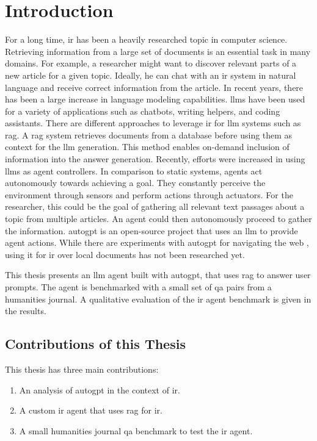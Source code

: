 \documentclass[../main.tex]{subfiles}
\begin{document}
\chapter{Introduction}
\label{ch:introduction}

For a long time, \gls{ir} has been a heavily researched topic in computer science.
Retrieving information from a large set of documents is an essential task in many domains.
For example,
a researcher might want to discover relevant parts of a new article for a given topic.
Ideally, he can chat with an \gls{ir} system in natural language
and receive correct information from the article.
In recent years, there has been a large increase in language modeling capabilities.
\Glspl{llm} have been used for a variety of applications such as chatbots,
writing helpers, and coding assistants.
There are different approaches to leverage \gls{ir} for \gls{llm} systems such as \gls{rag}.
A \Gls{rag} system retrieves documents from a database before using them as context
for the \gls{llm} generation.
This method enables on-demand inclusion of information into the answer generation.
Recently, efforts were increased in using \glspl{llm} as agent controllers.
In comparison to static systems, agents act autonomously towards achieving a goal.
They constantly perceive the environment through sensors and perform actions
through actuators.
For the researcher,
this could be the goal of gathering all relevant text passages about a topic from
multiple articles.
An agent could then autonomously proceed to gather the information.
\Gls{autogpt} is an open-source project that uses an \gls{llm} to provide agent
actions.
While there are experiments with \gls{autogpt} for navigating the web \cite{Yang2023},
using it for \gls{ir} over local documents has not been researched yet.

This thesis presents an \gls{llm} agent built with \gls{autogpt},
that uses \gls{rag} to answer user prompts.
The agent is benchmarked with a small set of \gls{qa} pairs from a humanities journal.
A qualitative evaluation of the \gls{ir} agent benchmark is given in the results.

\section{Contributions of this Thesis}

This thesis has three main contributions:
\begin{enumerate}
    \item An analysis of \gls{autogpt} in the context of \gls{ir}.
    \item A custom \gls{ir} agent that uses \gls{rag} for \gls{ir}.
    \item A small humanities journal \gls{qa} benchmark to test the \gls{ir} agent.
\end{enumerate}
\end{document}
